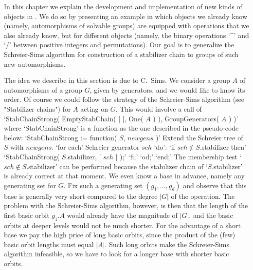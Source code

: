 
In  this chapter we explain  the   development and implementation of  new
kinds  of objects in {\GAP}. We  do so by  presenting an example in which
objects  we already know (namely, automorphisms   of solvable groups) are
equipped with  operations that we   also already know, but for  different
objects (namely, the  binary  operations  `^'  and `/' between   positive
integers and permutations). Our  goal is to generalize  the Schreier-Sims
algorithm for  construction of a stabilizer  chain to groups  of such new
automorphisms.

\null

The  idea we describe  in this section is  due to C.~Sims.  We consider a
group  $A$ of automorphisms  of a group $G$, given  by generators, and we
would like to  know its order. Of course  we could follow the strategy of
the  Schreier-Sims algorithm (see "Stabilizer chains")  for $A$ acting on
$G$. This would involve a call of  `StabChainStrong( EmptyStabChain( [ ],
One(  $A$  ) ), GroupGenerators( $A$  )  )' where `StabChainStrong'  is a
function as the one described in the pseudo-code below:
\bigskip
{\obeylines\frenchspacing
`StabChainStrong := function( $S$, $newgens$ )'
\quad Extend the Schreier tree of $S$ with $newgens$.
\quad `for each' Schreier generator $sch$ `do':
\qquad `if $sch \notin S$.stabilizer  then'
\qquad\quad `StabChainStrong( $S$.stabilizer, [ $sch$ ] );'
\qquad `fi;'
\quad `od;'
`end;'}
\bigskip \noindent
The membership test `$sch  \notin S$.stabilizer' can be performed because
the  stabilizer chain  of `$S$.stabilizer'  is   already correct at  that
moment. We  even know a base  in advance, namely  any  generating set for
$G$. Fix such  a generating set  $(g_1,\ldots,g_d)$ and observe that this
base  is  generally very   short compared  to   the degree $|G|$  of  the
operation. The problem with the Schreier-Sims algorithm, however, is then
that the length of the first  basic orbit $g_1.A$  would already have the
magnitude of $|G|$,  and the basic orbits at  deeper levels would  not be
much shorter. For the advantage of a short base  we pay the high price of
long basic  orbits, since the  product of  the  (few) basic orbit lengths
must  equal $|A|$.  Such  long  orbits  make the Schreier-Sims  algorithm
infeasible,   so we have to   look for a  longer base  with shorter basic
orbits.

